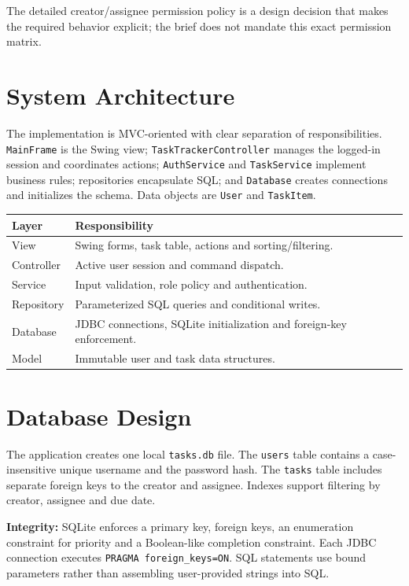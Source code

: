 \documentclass[11pt,a4paper]{article}
\begin{document}
The detailed creator/assignee permission policy is a design decision that makes the required behavior explicit; the brief does not mandate this exact permission matrix.

\section{System Architecture}
The implementation is MVC-oriented with clear separation of responsibilities. \texttt{MainFrame} is the Swing view; \texttt{TaskTrackerController} manages the logged-in session and coordinates actions; \texttt{AuthService} and \texttt{TaskService} implement business rules; repositories encapsulate SQL; and \texttt{Database} creates connections and initializes the schema. Data objects are \texttt{User} and \texttt{TaskItem}.

\begin{tabularx}{\linewidth}{p{35mm}X}
\toprule Layer & Responsibility \\ \midrule
View & Swing forms, task table, actions and sorting/filtering.\\
Controller & Active user session and command dispatch.\\
Service & Input validation, role policy and authentication.\\
Repository & Parameterized SQL queries and conditional writes.\\
Database & JDBC connections, SQLite initialization and foreign-key enforcement.\\
Model & Immutable user and task data structures.\\
\bottomrule
\end{tabularx}

\section{Database Design}
The application creates one local \texttt{tasks.db} file. The \texttt{users} table contains a case-insensitive unique username and the password hash. The \texttt{tasks} table includes separate foreign keys to the creator and assignee. Indexes support filtering by creator, assignee and due date.

\textbf{Integrity:} SQLite enforces a primary key, foreign keys, an enumeration constraint for priority and a Boolean-like completion constraint. Each JDBC connection executes \texttt{PRAGMA foreign\_keys=ON}. SQL statements use bound parameters rather than assembling user-provided strings into SQL.
\end{document}
